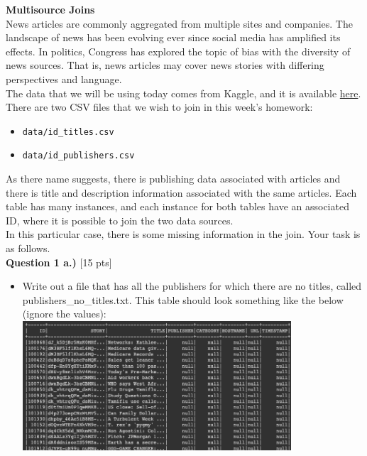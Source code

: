 \documentclass[paper=a4, fontsize=11pt]{scrartcl} %
\author{
    \textbf{YOUR NAME} \\ 
    \textbf{YOUR GIT USERNAME} \\ 
    \textbf{YOUR E-MAIL}
}%
\begin{document}
\maketitle %


{\huge \textbf{Multisource Joins}}  \\

News articles are commonly aggregated from multiple sites and companies. The landscape of news has been evolving ever since social media has amplified its effects. In politics, Congress has explored the topic of bias with the diversity of news sources. That is, news articles may cover news stories with differing perspectives and language. \\

The data that we will be using today comes from Kaggle, and it is available \href{https://course.ccs.neu.edu/cs6220/homework-3/}{here}. There are two CSV files that we wish to join in this week's homework:

\begin{itemize}
    \item \verb"data/id_titles.csv"
    \item \verb"data/id_publishers.csv"
\end{itemize}

As there name suggests, there is publishing data associated with articles and there is title and description information associated with the same articles. Each table has many instances, and each instance for both tables have an associated ID, where it is possible to join the two data sources. \\

In this particular case, there is some missing information in the join. Your task is as follows. \\

{\Large \textbf{Question 1 a.)} [15 pts]}
\begin{itemize}
    \item Write out a file that has all the publishers for which there are no titles, called publishers\_no\_titles.txt. This table should look something like the below (ignore the values): \\
    \includegraphics[width=100mm]{images/pub_no_title.png} \\
\end{itemize}
\end{document}
